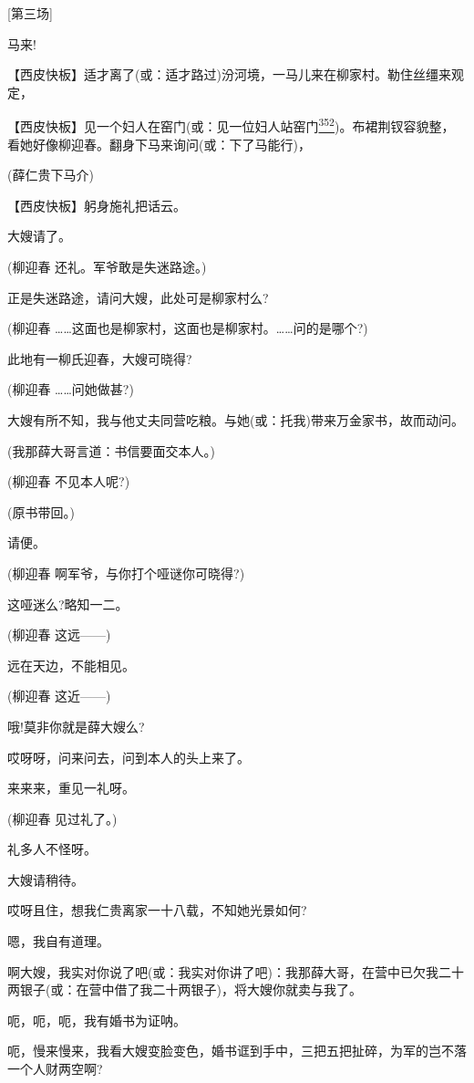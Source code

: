 {[}第三场{]}

马来!

【西皮快板】适才离了(或：适才路过)汾河境，一马儿来在柳家村。勒住丝缰来观定，

【西皮快板】见一个妇人在窑门(或：见一位妇人站窑门\protect\hyperlink{fn352}{\textsuperscript{352}})。布裙荆钗容貌整，看她好像柳迎春。翻身下马来询问(或：下了马能行)，

(薛仁贵下马介)

【西皮快板】躬身施礼把话云。

大嫂请了。

(柳迎春 还礼。军爷敢是失迷路途。)

正是失迷路途，请问大嫂，此处可是柳家村么?

(柳迎春
\ldots{}\ldots{}这面也是柳家村，这面也是柳家村。\ldots{}\ldots{}问的是哪个?)

此地有一柳氏迎春，大嫂可晓得?

(柳迎春 \ldots{}\ldots{}问她做甚?)

大嫂有所不知，我与他丈夫同营吃粮。与她(或：托我)带来万金家书，故而动问。

(我那薛大哥言道：书信要面交本人。)

(柳迎春 不见本人呢?)

(原书带回。)

请便。

(柳迎春 啊军爷，与你打个哑谜你可晓得?)

这哑迷么?略知一二。

(柳迎春 这远------)

远在天边，不能相见。

(柳迎春 这近------)

哦!莫非你就是薛大嫂么?

哎呀呀，问来问去，问到本人的头上来了。

来来来，重见一礼呀。

(柳迎春 见过礼了。)

礼多人不怪呀。

大嫂请稍待。

哎呀且住，想我仁贵离家一十八载，不知她光景如何?

嗯，我自有道理。

啊大嫂，我实对你说了吧(或：我实对你讲了吧)：我那薛大哥，在营中已欠我二十两银子(或：在营中借了我二十两银子)，将大嫂你就卖与我了。

呃，呃，呃，我有婚书为证呐。

呃，慢来慢来，我看大嫂变脸变色，婚书诓到手中，三把五把扯碎，为军的岂不落一个人财两空啊?

